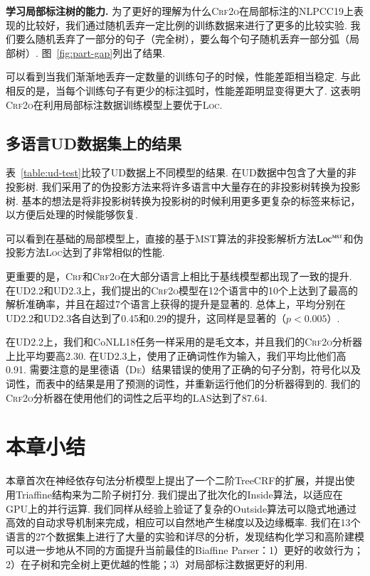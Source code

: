 \noindent\textbf{学习局部标注树的能力.}
为了更好的理解为什么\textsc{Crf2o}在局部标注的NLPCC19上表现的比较好，我们通过随机丢弃一定比例的训练数据来进行了更多的比较实验.
我们要么随机丢弃了一部分的句子（完全树），要么每个句子随机丢弃一部分弧（局部树）.
图~\ref{fig:part-gap}列出了结果.

可以看到当我们渐渐地丢弃一定数量的训练句子的时候，性能差距相当稳定.
与此相反的是，当每个训练句子有更少的标注弧时，性能差距明显变得更大了.
这表明\textsc{Crf2o}在利用局部标注数据训练模型上要优于\textsc{Loc}.



\subsection{多语言UD数据集上的结果}

表~\ref{table:ud-test}比较了UD数据上不同模型的结果.
在UD数据中包含了大量的非投影树.
我们采用了\citet{nivre-nilsson-2005-pseudo}的伪投影方法来将许多语言中大量存在的非投影树转换为投影树.
基本的想法是将非投影树转换为投影树的时候利用更多更复杂的标签来标记，以方便后处理的时候能够恢复.

可以看到在基础的局部模型上，直接的基于MST算法的非投影解析方法$\textsc{Loc}^{\textsc{mst}}$和伪投影方法\textsc{Loc}达到了非常相似的性能.

更重要的是，\textsc{Crf}和\textsc{Crf2o}在大部分语言上相比于基线模型都出现了一致的提升.
在UD2.2和UD2.3上，我们提出的\textsc{Crf2o}模型在12个语言中的10个上达到了最高的解析准确率，并且在超过7个语言上获得的提升是显著的.
总体上，平均分别在UD2.2和UD2.3各自达到了0.45和0.29的提升，这同样是显著的（$p<0.005$）.

在UD2.2上，我们和CoNLL18任务一样采用的是毛文本，并且我们的\textsc{Crf2o}分析器上比\citet{ji-etal-2019-graph}平均要高2.30.
在UD2.3上，\citet{zhang-etal-2019-empirical}使用了正确词性作为输入，我们平均比他们高0.91.
需要注意的是\citet{ji-etal-2019-graph}里德语（\textsc{De}）结果错误的使用了正确的句子分割，符号化以及词性，而表中的结果是用了预测的词性，并重新运行他们的分析器得到的.
我们的\textsc{Crf2o}分析器在使用他们的词性之后平均的LAS达到了87.64.

\section{本章小结}
\label{sec:dep-conclusions}

本章首次在神经依存句法分析模型上提出了一个二阶TreeCRF的扩展，并提出使用Triaffine结构来为二阶子树打分.
我们提出了批次化的Inside算法，以适应在GPU上的并行运算.
我们同样从经验上验证了复杂的Outside算法可以隐式地通过高效的自动求导机制来完成，相应可以自然地产生梯度以及边缘概率.
我们在13个语言的27个数据集上进行了大量的实验和详尽的分析，发现结构化学习和高阶建模可以进一步地从不同的方面提升当前最佳的Biaffine Parser：1）更好的收敛行为；2）在子树和完全树上更优越的性能；3）对局部标注数据更好的利用.
